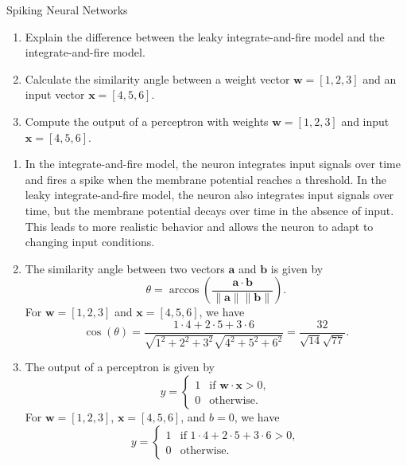 \documentclass{article}
\begin{document}
\begin{exercise}{Spiking Neural Networks}
  \begin{enumerate}
    \item Explain the difference between the leaky integrate-and-fire model and the integrate-and-fire model.
    \item Calculate the similarity angle between a weight vector $\mathbf{w} = [1, 2, 3]$ and an input vector $\mathbf{x} = [4, 5, 6]$.
    \item Compute the output of a perceptron with weights $\mathbf{w} = [1, 2, 3]$ and input $\mathbf{x} = [4, 5, 6]$.
  \end{enumerate}

  \begin{solution}
    \begin{enumerate}
      \item In the integrate-and-fire model, the neuron integrates input signals over time and fires a spike when the membrane potential reaches a threshold. In the leaky integrate-and-fire model, the neuron also integrates input signals over time, but the membrane potential decays over time in the absence of input. This leads to more realistic behavior and allows the neuron to adapt to changing input conditions.
      \item The similarity angle between two vectors $\mathbf{a}$ and $\mathbf{b}$ is given by
            \[ \theta = \arccos(\frac{\mathbf{a} \cdot \mathbf{b}}{\|\mathbf{a}\| \|\mathbf{b}\|}). \]
            For $\mathbf{w} = [1, 2, 3]$ and $\mathbf{x} = [4, 5, 6]$, we have
            \[ \cos(\theta) = \frac{1 \cdot 4 + 2 \cdot 5 + 3 \cdot 6}{\sqrt{1^2 + 2^2 + 3^2} \sqrt{4^2 + 5^2 + 6^2}} = \frac{32}{\sqrt{14} \sqrt{77}}. \]
      \item The output of a perceptron is given by
            \[
              y = \begin{cases}
                1 & \text{if } \mathbf{w} \cdot \mathbf{x} > 0, \\
                0 & \text{otherwise}.
              \end{cases}
            \]
            For $\mathbf{w} = [1, 2, 3]$, $\mathbf{x} = [4, 5, 6]$, and $b = 0$, we have
            \[
              y = \begin{cases}
                1 & \text{if } 1 \cdot 4 + 2 \cdot 5 + 3 \cdot 6 > 0, \\
                0 & \text{otherwise}.
              \end{cases}
            \]
    \end{enumerate}
  \end{solution}
\end{exercise}
\end{document}
